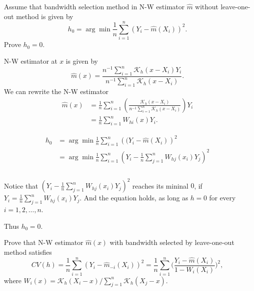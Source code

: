 \begin{problem}[HW 13.1]
Assume that bandwidth selection method in N-W estimator $\hat{m}$ without leave-one-out method is given by
\begin{equation*}
    h_0=\arg\min\frac1n\sum_{i=1}^n(Y_i-\hat{m}(X_i))^2.
\end{equation*}
Prove $h_0 = 0$.
\end{problem}

\begin{solution}
    N-W estimator at $x$ is given by
    \begin{equation*}
        \hat{m}(x)=\frac{n^{-1} \sum_{i=1}^{n} \mathcal{K}_{h}\left(x-X_{i}\right) Y_{i}}{n^{-1} \sum_{i=1}^{n} \mathcal{K}_{h}\left(x-X_{i}\right)}.
    \end{equation*}
    We can rewrite the N-W estimator
    \begin{equation*}
        \begin{split} 
            \hat{m}(x) 
            &=\frac{1}{n} \sum_{i=1}^{n}\left(\frac{\mathcal{K}_{h}\left(x-X_{i}\right)}{n^{-1} \sum_{i=1}^{n} \mathcal{K}_{h}\left(x-X_{i}\right)}\right) Y_{i} \\ 
            &=\frac{1}{n} \sum_{i=1}^{n} W_{h i}(x) Y_{i} .
        \end{split}
    \end{equation*}

    \begin{equation*}
        \begin{split}
            h_0
            & = \arg\min\frac1n \sum_{i=1}^n \left((Y_i-\hat{m}(X_i)\right)^2 \\
            & = \arg\min\frac1n \sum_{i=1}^n \left(Y_i- \frac{1}{n} \sum_{j=1}^{n} W_{h j}(x_i) Y_{j} \right)^2 \\ \\
        \end{split}
    \end{equation*}

    Notice that $\left(Y_i- \frac{1}{n} \sum_{j=1}^{n} W_{h j}(x_i) Y_{j} \right)^2$ reaches its mininal $0$, if $Y_i = \frac{1}{n} \sum_{j=1}^{n} W_{h j}(x_i) Y_{j}$. 
    And the equation holds, as long as $h=0$ for every $i=1,2,\dots,n$. 

    Thus $h_0 = 0$. 
\end{solution}


\begin{problem}[HW 13.2]
    Prove that N-W estimator $\hat{m}(x)$ with bandwidth selected by leave-one-out method satisfies
    \begin{equation*}
        CV(h)=\frac1n\sum_{i=1}^n(Y_i-\hat{m}_{-i}(X_i))^2=\frac1n\sum_{i=1}^n\Big(\frac{Y_i-\hat{m}(X_i)}{1-W_i(X_i)}\Big)^2,
    \end{equation*}
    where $W_i(x)= \mathcal{K}_h(X_i-x)/\sum_{j=1}^n \mathcal{K}_h(X_j-x)$.
\end{problem}


